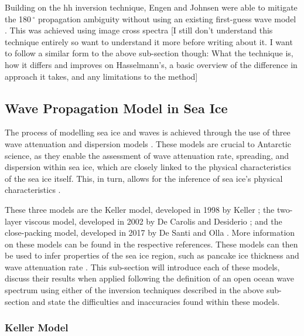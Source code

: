 Building on the \ac{hh} inversion technique, Engen and Johnsen were able to mitigate the 180\,$^{\circ}$ propagation ambiguity without using an existing first-guess wave model \cite{Engen1995}. This was achieved using image cross spectra [I still don't understand this technique entirely so want to understand it more before writing about it. I want to follow a similar form to the above sub-section though: What the technique is, how it differs and improves on Hasselmann's, a basic overview of the difference in approach it takes, and any limitations to the method]

\subsection{Wave Propagation Model in Sea Ice} \label{subsec:litReview.sarCharac.seaIceWaveModelling}

The process of modelling sea ice and waves is achieved through the use of three wave attenuation and dispersion models \cite{DeCarolis2021, DeSanti2018}. These models are crucial to Antarctic science, as they enable the assessment of wave attenuation rate, spreading, and dispersion within sea ice, which are closely linked to the physical characteristics of the sea ice itself. This, in turn, allows for the inference of sea ice's physical characteristics \cite{DeCarolis2002}.

These three models are the Keller model, developed in 1998 by Keller \cite{Keller1998}; the two-layer viscous model, developed in 2002 by De Carolis and Desiderio \cite{DeCarolis2002}; and the close-packing model, developed in 2017 by De Santi and Olla \cite{DeSanti2017}. More information on these models can be found in the respective references. These models can then be used to infer properties of the sea ice region, such as pancake ice thickness and wave attenuation rate \cite{Aulicino2019}. This sub-section will introduce each of these models, discuss their results when applied following the definition of an open ocean wave spectrum using either of the inversion techniques described in the above sub-section and state the difficulties and inaccuracies found within these models.

\subsubsection{Keller Model} \label{subsubsec:litReview.sarCharac.seaIceWaveModelling.Keller}

